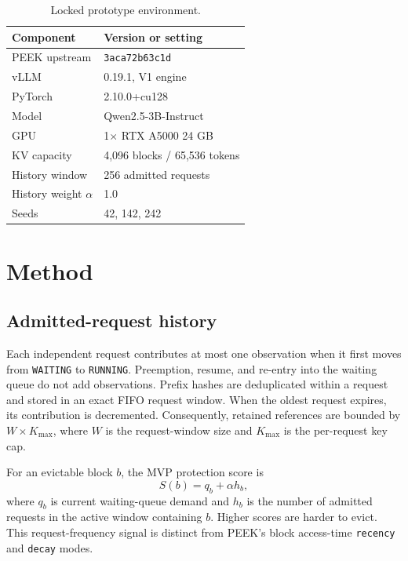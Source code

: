 \documentclass[10pt,twocolumn]{article}
\begin{document}
\begin{table}[t]
  \centering
  \caption{Locked prototype environment.}
  \label{tab:environment}
  \begin{tabular}{ll}
    \toprule
    Component & Version or setting \\
    \midrule
    PEEK upstream & \texttt{3aca72b63c1d} \\
    vLLM & 0.19.1, V1 engine \\
    PyTorch & 2.10.0+cu128 \\
    Model & Qwen2.5-3B-Instruct \\
    GPU & 1$\times$ RTX A5000 24 GB \\
    KV capacity & 4,096 blocks / 65,536 tokens \\
    History window & 256 admitted requests \\
    History weight $\alpha$ & 1.0 \\
    Seeds & 42, 142, 242 \\
    \bottomrule
  \end{tabular}
\end{table}

\section{Method}

\subsection{Admitted-request history}

Each independent request contributes at most one observation when it first
moves from \texttt{WAITING} to \texttt{RUNNING}. Preemption, resume, and
re-entry into the waiting queue do not add observations. Prefix hashes are
deduplicated within a request and stored in an exact FIFO request window. When
the oldest request expires, its contribution is decremented. Consequently,
retained references are bounded by
$W\times K_{\max}$, where $W$ is the request-window size and $K_{\max}$ is the
per-request key cap.

For an evictable block $b$, the MVP protection score is
\begin{equation}
  S(b) = q_b + \alpha h_b,
  \label{eq:score}
\end{equation}
where $q_b$ is current waiting-queue demand and $h_b$ is the number of admitted
requests in the active window containing $b$. Higher scores are harder to
evict. This request-frequency signal is distinct from PEEK's block access-time
\texttt{recency} and \texttt{decay} modes.
\end{document}
